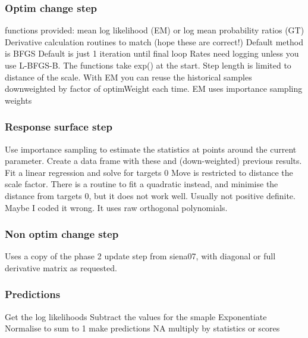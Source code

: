 \documentclass[12pt, a4paper]{article}
\renewcommand{\=}{\,=\,}
\newcommand{\+}{\,+\,}
\begin{document}
\subsubsection{Optim change step}
\label{sec:optim}
\begin{algorithmic}
 functions provided: mean log likelihood (EM) or log mean
probability ratios (GT)
\STATE Derivative calculation routines to match (hope these are correct!)
\STATE Default method is BFGS
\STATE Default is just 1 iteration until final loop
\STATE Rates need logging unless you use L-BFGS-B. The functions take exp() at
the start.
\STATE Step length is limited to distance of the scale.
\STATE With EM you can reuse the historical samples downweighted by factor of
optimWeight each time.
\STATE EM uses importance sampling weights
\end{algorithmic}
\subsubsection{Response surface step}
\label{sec:resp}
\begin{algorithmic}
\STATE Use importance sampling to estimate the statistics at points around the
current parameter.
\STATE Create a data frame with these and (down-weighted) previous results.
\STATE Fit a linear regression and solve for targets 0
\STATE Move is restricted to distance the scale factor.
\STATE There is a routine to fit a quadratic instead, and minimise the distance
from targets 0, but it does not work well. Usually not positive definite. Maybe
I coded it wrong. It uses raw orthogonal polynomials.
\end{algorithmic}
\subsubsection{Non optim change step}
\label{sec:algchange}
\begin{algorithmic}
\STATE Uses a copy of the phase 2 update step from siena07, with diagonal or full
derivative matrix as requested.
\end{algorithmic}
\subsubsection{Predictions}
\label{sec:pred}
\begin{algorithmic}
\STATE Get the log likelihoods
\STATE Subtract the values for the smaple
\STATE Exponentiate
\STATE Normalise to sum to 1
\STATE make predictions NA
\ELSE
\STATE multiply by statistics or scores
\ENDIF
\end{algorithmic}
\end{document}
